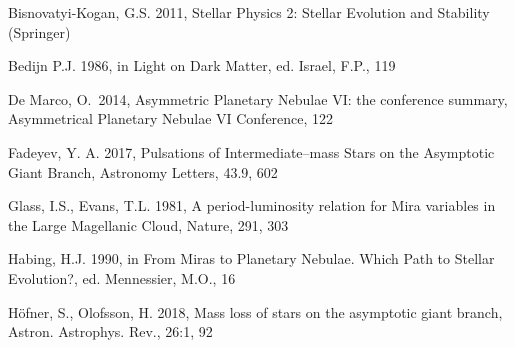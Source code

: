 \documentclass[a4paper,11pt,twocolumn]{article}
\begin{document}
\begin{thebibliography}{9}
    
    Bisnovatyi-Kogan, G.S. 2011, Stellar Physics 2: Stellar Evolution and Stability (Springer)
    

    Bedijn P.J. 1986, in Light on Dark Matter, ed. Israel, F.P., 119


     De Marco, O.\ 2014, Asymmetric Planetary Nebulae VI: the conference summary, Asymmetrical Planetary Nebulae VI Conference, 122

    Fadeyev, Y. A. 2017, Pulsations of Intermediate–mass Stars on the Asymptotic Giant Branch,  Astronomy Letters, 43.9, 602


    Glass, I.S., Evans, T.L. 1981, A period-luminosity relation for Mira variables in the Large Magellanic Cloud, Nature, 291, 303

    Habing, H.J. 1990, in From Miras to Planetary Nebulae. Which Path to Stellar Evolution?, ed. Mennessier, M.O., 16 

    Höfner, S., Olofsson, H. 2018, Mass loss of stars on the asymptotic giant branch, Astron. Astrophys. Rev., 26:1, 92



\end{thebibliography}
\end{document}
